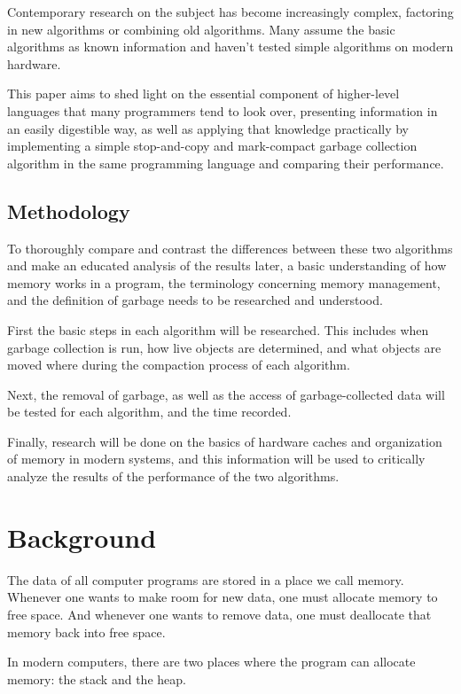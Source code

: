 \documentclass[index]{subfiles}
\begin{document}
Contemporary research on the subject has become increasingly complex, factoring in new algorithms or combining old algorithms. Many assume the basic algorithms as known information and haven't tested simple algorithms on modern hardware.

This paper aims to shed light on the essential component of higher-level languages that many programmers tend to look over, presenting information in an easily digestible way, as well as applying that knowledge practically by implementing a simple stop-and-copy and mark-compact garbage collection algorithm in the same programming language and comparing their performance.

\subsection{Methodology}

To thoroughly compare and contrast the differences between these two algorithms and make an educated analysis of the results later, a basic understanding of how memory works in a program, the terminology concerning memory management, and the definition of garbage needs to be researched and understood.

First the basic steps in each algorithm will be researched. This includes when garbage collection is run, how live objects are determined, and what objects are moved where during the compaction process of each algorithm.

Next, the removal of garbage, as well as the access of garbage-collected data will be tested for each algorithm, and the time recorded.

Finally, research will be done on the basics of hardware caches and organization of memory in modern systems, and this information will be used to critically analyze the results of the performance of the two algorithms.

\section{Background}

The data of all computer programs are stored in a place we call memory. Whenever one wants to make room for new data, one must allocate memory to free space. And whenever one wants to remove data, one must deallocate that memory back into free space.

In modern computers, there are two places where the program can allocate memory: the stack and the heap\cite{the_rust_programming_language}.
\end{document}
